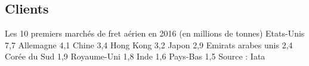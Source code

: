 \subsection{Clients}


Les 10 premiers marchés de fret aérien en 2016 
(en millions de tonnes)
Etats-Unis  	7,7
Allemagne 	4,1
Chine  	3,4
Hong Kong	3,2
Japon	2,9
Emirats arabes unis 	2,4
Corée du Sud 	1,9
Royaume-Uni 	1,8
Inde  	1,6
Pays-Bas 	1,5
Source : Iata